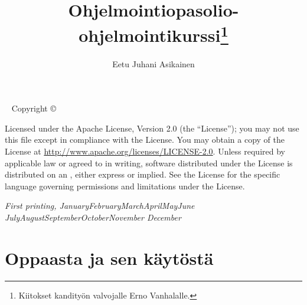 \documentclass{tufte-book}
\title{Ohjelmointiopas{\small \lutin olio-ohjelmointikurssi}\thanks{Kiitokset kandityön valvojalle
Erno Vanhalalle.}}
\author[Eetu Juhani Asikainen]{Eetu Juhani Asikainen}
\newcommand{\monthyear}{
  \ifcase\month\or January\or February\or March\or April\or May\or June\or
  July\or August\or September\or October\or November\or
  December\fi\space\number\year
}
\begin{document}
\frontmatter

\maketitle

\newpage
\begin{fullwidth}
~\vfill
\thispagestyle{empty}
\setlength{\parindent}{0pt}
\setlength{\parskip}{\baselineskip}
Copyright \copyright\ \the\year\ \thanklessauthor

\par{}

\par{}

\par Licensed under the Apache License, Version 2.0 (the ``License''); you may not
use this file except in compliance with the License. You may obtain a copy
of the License at \url{http://www.apache.org/licenses/LICENSE-2.0}. Unless
required by applicable law or agreed to in writing, software distributed
under the License is distributed on an , either express or implied. See the
License for the specific language governing permissions and limitations
under the License.

\par\textit{First printing, \monthyear}
\end{fullwidth}

\tableofcontents


\mainmatter


\chapter{Oppaasta ja sen käytöstä}
\label{oppaasta}
\end{document}
